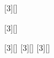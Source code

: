 
\renewcommand{\sectionmark}[1]{\markright{#1}}
\renewcommand{\leftmark}{\rightmark}
\pagestyle{fancy}
\lhead{}
\chead{}
\rhead{\thesection\space\contentsname}
\lfoot{}
\cfoot{}
\rfoot{\ \linebreak \thepage}
\renewcommand{\headrulewidth}{0.4pt}
\renewcommand{\footrulewidth}{0.4pt}

\renewcommand{\thesection}{\Roman{section}}
\renewcommand{\theHsection}{\Roman{section}}

\newcommand{\folgen}[1]{
\ensuremath
#1
}

[3][]{
	\def\studentName{#1}%
	\def\studentMatnr{#2}%
	\def\studentStudiengang{#3}%
}

[3][]{
	\def\studentNamet{#1}%
	\def\studentMatnrt{#2}%
	\def\studentStudiengangt{#3}%
}


[3][]{
	\def\studentNamett{#1}%
	\def\studentMatnrtt{#2}%
	\def\studentStudiengangtt{#3}%
}
[3][]{
	\def\studentNamettt{#1}%
	\def\studentMatnrttt{#2}%
	\def\studentStudiengangttt{#3}%
}
[3][]{
	\def\studentNametttt{#1}%
	\def\studentMatnrtttt{#2}%
	\def\studentStudiengangtttt{#3}%
}


